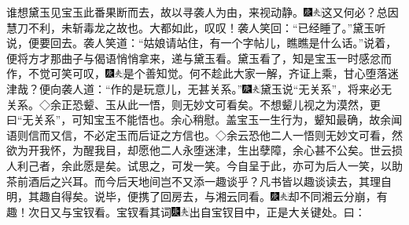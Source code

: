 谁想黛玉见宝玉此番果断而去，故以寻袭人为由，来视动静。{\includegraphics[width=3mm]{../Images/00004}\includegraphics[width=3mm]{../Images/00012}\footnotesize \kaishu 这又何必？总因慧刀不利，未斩毒龙之故也。大都如此，叹叹！}袭人笑回：``已经睡了。''黛玉听说，便要回去。袭人笑道：``姑娘请站住，有一个字帖儿，瞧瞧是什么话。''说着，便将方才那曲子与偈语悄悄拿来，递与黛玉看。黛玉看了，知是宝玉一时感忿而作，不觉可笑可叹，{\includegraphics[width=3mm]{../Images/00004}\includegraphics[width=3mm]{../Images/00012}\footnotesize \kaishu 是个善知觉。何不趁此大家一解，齐证上乘，甘心堕落迷津哉？}便向袭人道：``作的是玩意儿，无甚关系。''{\includegraphics[width=3mm]{../Images/00004}\includegraphics[width=3mm]{../Images/00012}\footnotesize \kaishu 黛玉说``无关系''，将来必无关系。◇余正恐颦、玉从此一悟，则无妙文可看矣。不想颦儿视之为漠然，更曰``无关系''，可知宝玉不能悟也。余心稍慰。盖宝玉一生行为，颦知最确，故余闻语则信而又信，不必定玉而后证之方信也。◇余云恐他二人一悟则无妙文可看，然欲为开我怀，为醒我目，却愿他二人永堕迷津，生出孽障，余心甚不公矣。世云损人利己者，余此愿是矣。试思之，可发一笑。今自呈于此，亦可为后人一笑，以助茶前酒后之兴耳。而今后天地间岂不又添一趣谈乎？凡书皆以趣谈读去，其理自明，其趣自得矣。}说毕，便携了回房去，与湘云同看。{\includegraphics[width=3mm]{../Images/00004}\includegraphics[width=3mm]{../Images/00012}\footnotesize \kaishu 却不同湘云分崩，有趣！}次日又与宝钗看。宝钗看其词{\includegraphics[width=3mm]{../Images/00004}\includegraphics[width=3mm]{../Images/00012}\footnotesize \kaishu 出自宝钗目中，正是大关键处。}曰：

